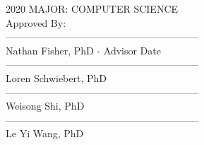 \begin{flushleft}
    \vspace*{-0.20in}
    \hspace*{3.09in}2020 %
    \hspace*{3.09in}MAJOR: COMPUTER SCIENCE\\ %
    \hspace*{3.09in}Approved By:\\
    \hspace*{3.09in}-----------------------------------------------------------\\
    \vspace*{-0.25in}
    \hspace*{3.09in}Nathan Fisher, PhD - Advisor\hspace*{0.5 in} Date\\
    \bigskip
    \hspace*{3.09in}-----------------------------------------------------------\\
    \vspace*{-0.25in}
    \hspace*{3.09in}Loren Schwiebert, PhD\\
    \bigskip
    \hspace*{3.09in}-----------------------------------------------------------\\
    \vspace*{-0.25in}
    \hspace*{3.09in}Weisong Shi, PhD\\
    \bigskip
    \hspace*{3.09in}-----------------------------------------------------------\\
    \vspace*{-0.25in}
    \hspace*{3.09in}Le Yi Wang, PhD\\
\end{flushleft}
